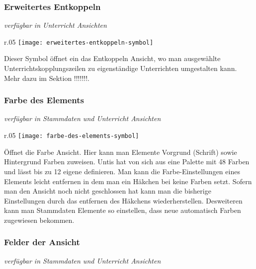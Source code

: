 \subsubsection{Erweitertes Entkoppeln}
{\small\textit{verfügbar in Unterricht Ansichten\\}\par}

\begin{wrapfigure}{r}{.05\textwidth}
	\vspace{-50pt}
	\texttt{[image: erweitertes-entkoppeln-symbol]}
	\vspace{-35pt}
\end{wrapfigure}

\noindent
Dieser Symbol öffnet ein das Entkoppeln Ansicht, wo man ausgewählte Unterrichtskopplungszeilen zu eigenständige Unterrichten umgestalten kann. Mehr dazu im Sektion !!!!!!!.\\

\subsubsection{Farbe des Elements}
{\small\textit{verfügbar in Stammdaten und Unterricht Ansichten\\}\par}

\begin{wrapfigure}{r}{.05\textwidth}
	\vspace{-50pt}
	\texttt{[image: farbe-des-elements-symbol]}
	\vspace{-35pt}
\end{wrapfigure}

\noindent
Öffnet die Farbe Ansicht. Hier kann man Elemente Vorgrund (Schrift) sowie Hintergrund Farben zuweisen. Untis hat von sich aus eine Palette mit 48 Farben und lässt bis zu 12 eigene definieren. Man kann die Farbe-Einstellungen eines Elements leicht entfernen in dem man ein Häkchen bei keine Farben setzt. Sofern man den Ansicht noch nicht geschlossen hat kann man die bisherige Einstellungen durch das entfernen des Häkchens wiederherstellen. Desweiteren kann man Stammdaten Elemente so einstellen, dass neue automatisch Farben zugewiesen bekommen.\\

\subsubsection{Felder der Ansicht}
{\small\textit{verfügbar in Stammdaten und Unterricht Ansichten\\}\par}

